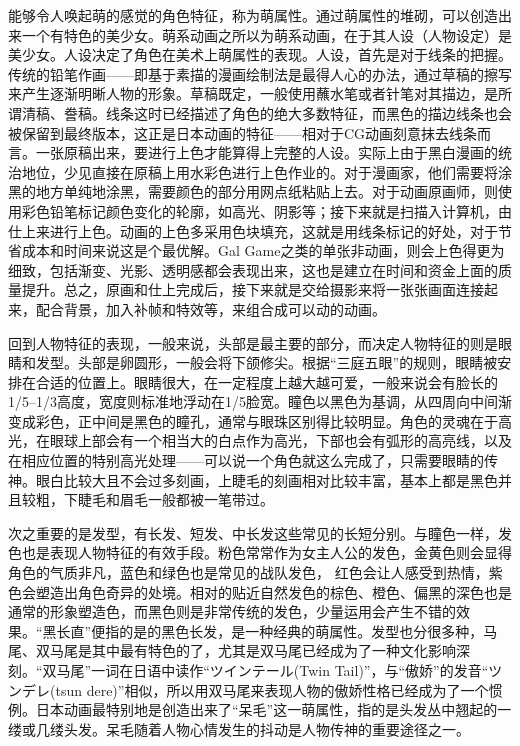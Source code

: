 \documentclass[cs5size,b5paper,nofonts]{ctexart}
\begin{document}
\begin{multicols}{2}
\smallskip

能够令人唤起萌的感觉的角色特征，称为萌属性。通过萌属性的堆砌，可以创造出来一个有特色的美少女。萌系动画之所以为萌系动画，在于其人设（人物设定）是美少女。人设决定了角色在美术上萌属性的表现。人设，首先是对于线条的把握。传统的铅笔作画——即基于素描的漫画绘制法是最得人心的办法，通过草稿的擦写来产生逐渐明晰人物的形象。草稿既定，一般使用蘸水笔或者针笔对其描边，是所谓清稿、誊稿。线条这时已经描述了角色的绝大多数特征，而黑色的描边线条也会被保留到最终版本，这正是日本动画的特征——相对于CG动画刻意抹去线条而言。一张原稿出来，要进行上色才能算得上完整的人设。实际上由于黑白漫画的统治地位，少见直接在原稿上用水彩色进行上色作业的。对于漫画家，他们需要将涂黑的地方单纯地涂黑，需要颜色的部分用网点纸粘贴上去。对于动画原画师，则使用彩色铅笔标记颜色变化的轮廓，如高光、阴影等；接下来就是扫描入计算机，由仕上来进行上色。动画的上色多采用色块填充，这就是用线条标记的好处，对于节省成本和时间来说这是个最优解。Gal Game之类的单张非动画，则会上色得更为细致，包括渐变、光影、透明感都会表现出来，这也是建立在时间和资金上面的质量提升。总之，原画和仕上完成后，接下来就是交给摄影来将一张张画面连接起来，配合背景，加入补帧和特效等，来组合成可以动的动画。

回到人物特征的表现，一般来说，头部是最主要的部分，而决定人物特征的则是眼睛和发型。头部是卵圆形，一般会将下颌修尖。根据“三庭五眼”的规则，眼睛被安排在合适的位置上。眼睛很大，在一定程度上越大越可爱，一般来说会有脸长的1/5--1/3高度，宽度则标准地浮动在1/5脸宽。瞳色以黑色为基调，从四周向中间渐变成彩色，正中间是黑色的瞳孔，通常与眼珠区别得比较明显。角色的灵魂在于高光，在眼球上部会有一个相当大的白点作为高光，下部也会有弧形的高亮线，以及在相应位置的特别高光处理——可以说一个角色就这么完成了，只需要眼睛的传神。眼白比较大且不会过多刻画，上睫毛的刻画相对比较丰富，基本上都是黑色并且较粗，下睫毛和眉毛一般都被一笔带过。

次之重要的是发型，有长发、短发、中长发这些常见的长短分别。与瞳色一样，发色也是表现人物特征的有效手段。粉色常常作为女主人公的发色，金黄色则会显得角色的气质非凡，蓝色和绿色也是常见的战队发色， 红色会让人感受到热情，紫色会塑造出角色奇异的处境。相对的贴近自然发色的棕色、橙色、偏黑的深色也是通常的形象塑造色，而黑色则是非常传统的发色，少量运用会产生不错的效果。“黑长直”便指的是的黑色长发，是一种经典的萌属性。发型也分很多种，马尾、双马尾是其中最有特色的了，尤其是双马尾已经成为了一种文化影响深刻。“双马尾”一词在日语中读作“{\ja ツインテール}(Twin Tail)”，与“傲娇”的发音“{\ja ツンデレ}(tsun dere)”相似，所以用双马尾来表现人物的傲娇性格已经成为了一个惯例。日本动画最特别地是创造出来了“呆毛”这一萌属性，指的是头发丛中翘起的一缕或几缕头发。呆毛随着人物心情发生的抖动是人物传神的重要途径之一。


\end{multicols}
\end{document}
